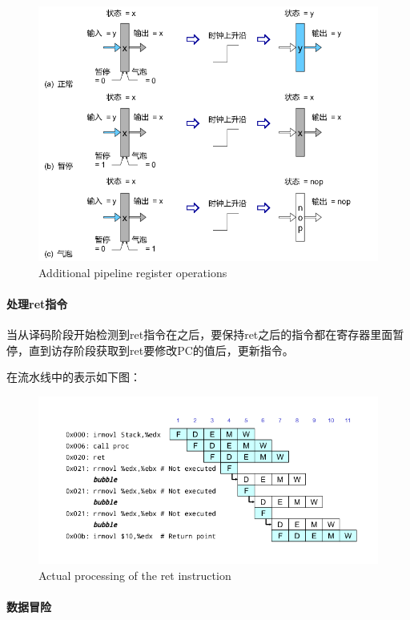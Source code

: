 \begin{figure}[htbp]
\centering
\includegraphics{img/eg-pipe-reg-full.png}
\caption{Additional pipeline register operations}
\end{figure}

\paragraph{处理ret指令}\label{ux5904ux7406retux6307ux4ee4}

当从译码阶段开始检测到ret指令在之后，要保持ret之后的指令都在寄存器里面暂停，直到访存阶段获取到ret要修改PC的值后，更新指令。

在流水线中的表示如下图：

\begin{figure}[htbp]
\centering
\includegraphics{img/prog7.png}
\caption{Actual processing of the ret instruction}
\end{figure}

\paragraph{数据冒险}\label{ux6570ux636eux5192ux9669-1}

